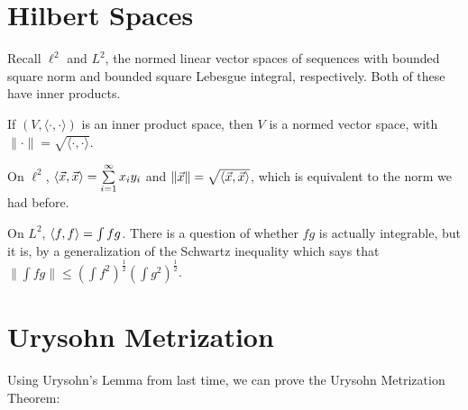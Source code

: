 

\section*{Hilbert Spaces}
Recall $\ell^2$ and $L^2$, the normed linear vector spaces of sequences with bounded square norm and bounded square Lebesgue integral, respectively.  Both of these have inner products.


If $(V,\langle\cdot,\cdot\rangle)$ is an inner product space, then $V$ is a normed vector space, with $\|\cdot \| = \sqrt{\langle\cdot,\cdot\rangle}$.

On $\ell^2$, $\innprod{\vec{x}}{\vec{y}} = \sum\limits_{i=1}^\infty x_iy_i$ and $\|\vec{x}\| = \sqrt{\innprod{\vec{x}}{\vec{x}}}$, which is equivalent to the norm we had before.

On $L^2$, $\innprod{f}{g} = \int fg$.  There is a question of whether $fg$ is actually integrable, but it is, by a generalization of the Schwartz inequality which says that $\|\int fg \| \leq (\int f^2)^\frac{1}{2} (\int{g^2})^\frac{1}{2}$.




\section*{Urysohn Metrization}

Using Urysohn's Lemma from last time, we can prove the Urysohn Metrization Theorem:


